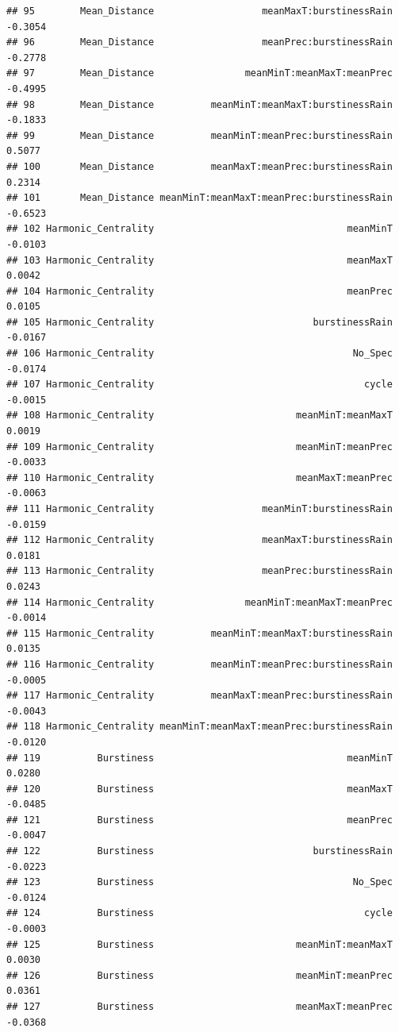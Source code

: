 \documentclass[
]{article}
\begin{document}
\begin{verbatim}
## 95        Mean_Distance                   meanMaxT:burstinessRain     -0.3054
## 96        Mean_Distance                   meanPrec:burstinessRain     -0.2778
## 97        Mean_Distance                meanMinT:meanMaxT:meanPrec     -0.4995
## 98        Mean_Distance          meanMinT:meanMaxT:burstinessRain     -0.1833
## 99        Mean_Distance          meanMinT:meanPrec:burstinessRain      0.5077
## 100       Mean_Distance          meanMaxT:meanPrec:burstinessRain      0.2314
## 101       Mean_Distance meanMinT:meanMaxT:meanPrec:burstinessRain     -0.6523
## 102 Harmonic_Centrality                                  meanMinT     -0.0103
## 103 Harmonic_Centrality                                  meanMaxT      0.0042
## 104 Harmonic_Centrality                                  meanPrec      0.0105
## 105 Harmonic_Centrality                            burstinessRain     -0.0167
## 106 Harmonic_Centrality                                   No_Spec     -0.0174
## 107 Harmonic_Centrality                                     cycle     -0.0015
## 108 Harmonic_Centrality                         meanMinT:meanMaxT      0.0019
## 109 Harmonic_Centrality                         meanMinT:meanPrec     -0.0033
## 110 Harmonic_Centrality                         meanMaxT:meanPrec     -0.0063
## 111 Harmonic_Centrality                   meanMinT:burstinessRain     -0.0159
## 112 Harmonic_Centrality                   meanMaxT:burstinessRain      0.0181
## 113 Harmonic_Centrality                   meanPrec:burstinessRain      0.0243
## 114 Harmonic_Centrality                meanMinT:meanMaxT:meanPrec     -0.0014
## 115 Harmonic_Centrality          meanMinT:meanMaxT:burstinessRain      0.0135
## 116 Harmonic_Centrality          meanMinT:meanPrec:burstinessRain     -0.0005
## 117 Harmonic_Centrality          meanMaxT:meanPrec:burstinessRain     -0.0043
## 118 Harmonic_Centrality meanMinT:meanMaxT:meanPrec:burstinessRain     -0.0120
## 119          Burstiness                                  meanMinT      0.0280
## 120          Burstiness                                  meanMaxT     -0.0485
## 121          Burstiness                                  meanPrec     -0.0047
## 122          Burstiness                            burstinessRain     -0.0223
## 123          Burstiness                                   No_Spec     -0.0124
## 124          Burstiness                                     cycle     -0.0003
## 125          Burstiness                         meanMinT:meanMaxT      0.0030
## 126          Burstiness                         meanMinT:meanPrec      0.0361
## 127          Burstiness                         meanMaxT:meanPrec     -0.0368

\end{verbatim}
\end{document}

